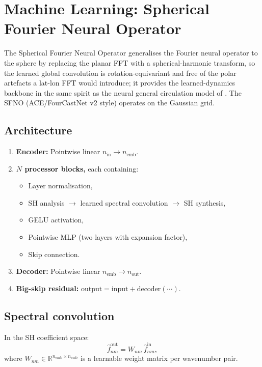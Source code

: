 \documentclass[11pt,a4paper]{article}
\begin{document}
\section{Machine Learning: Spherical Fourier Neural Operator}

The Spherical Fourier Neural Operator \citep{Bonev2023} generalises the
Fourier neural operator \citep{Li2021} to the sphere by replacing the
planar FFT with a spherical-harmonic transform, so the learned global
convolution is rotation-equivariant and free of the polar artefacts a
lat-lon FFT would introduce; it provides the learned-dynamics backbone
in the same spirit as the neural general circulation model of
\citet{Kochkov2024}.  The SFNO (ACE/FourCastNet v2 style) operates on
the Gaussian grid.

\subsection{Architecture}
\begin{enumerate}[nosep]
  \item \textbf{Encoder:} Pointwise linear $n_{\mathrm{in}}\to n_{\mathrm{emb}}$.
  \item \textbf{$N$ processor blocks,} each containing:
    \begin{itemize}[nosep]
      \item Layer normalisation,
      \item SH analysis $\to$ learned spectral convolution $\to$ SH synthesis,
      \item GELU activation,
      \item Pointwise MLP (two layers with expansion factor),
      \item Skip connection.
    \end{itemize}
  \item \textbf{Decoder:} Pointwise linear $n_{\mathrm{emb}}\to n_{\mathrm{out}}$.
  \item \textbf{Big-skip residual:} $\text{output}=\text{input}+\text{decoder}(\cdots)$.
\end{enumerate}

\subsection{Spectral convolution}
In the SH coefficient space:
\begin{equation}
  \hat f_{nm}^{\mathrm{out}} = W_{nm}\,\hat f_{nm}^{\mathrm{in}},
\end{equation}
where $W_{nm}\in\mathbb R^{n_{\mathrm{emb}}\times n_{\mathrm{emb}}}$ is a learnable weight matrix per wavenumber pair.
\end{document}
